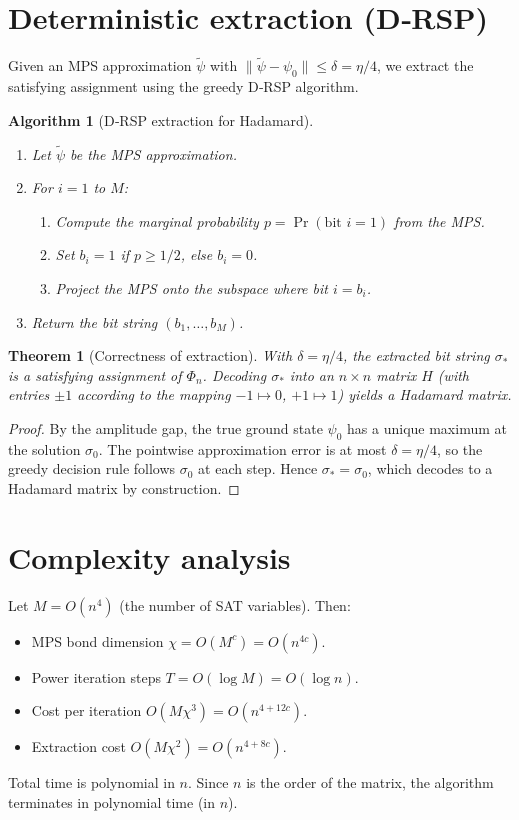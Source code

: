 \documentclass[11pt,a4paper]{article}
\newtheorem{theorem}{Theorem}[section]
\newtheorem{algorithm}{Algorithm}[section]
\begin{document}
\section{Deterministic extraction (D‑RSP)}

Given an MPS approximation $\tilde{\psi}$ with $\|\tilde{\psi} - \psi_0\| \le \delta = \eta/4$, we extract the satisfying assignment using the greedy D‑RSP algorithm.

\begin{algorithm}[D‑RSP extraction for Hadamard]\label{alg:drsp}
\begin{enumerate}
\item Let $\tilde{\psi}$ be the MPS approximation.
\item For $i = 1$ to $M$:
   \begin{enumerate}
   \item Compute the marginal probability $p = \Pr(\text{bit } i = 1)$ from the MPS.
   \item Set $b_i = 1$ if $p \ge 1/2$, else $b_i = 0$.
   \item Project the MPS onto the subspace where bit $i = b_i$.
   \end{enumerate}
\item Return the bit string $(b_1,\dots,b_M)$.
\end{enumerate}
\end{algorithm}

\begin{theorem}[Correctness of extraction]\label{thm:drsp}
With $\delta = \eta/4$, the extracted bit string $\sigma_*$ is a satisfying assignment of $\Phi_n$. Decoding $\sigma_*$ into an $n\times n$ matrix $H$ (with entries $\pm1$ according to the mapping $-1\mapsto0$, $+1\mapsto1$) yields a Hadamard matrix.
\end{theorem}
\begin{proof}
By the amplitude gap, the true ground state $\psi_0$ has a unique maximum at the solution $\sigma_0$. The pointwise approximation error is at most $\delta = \eta/4$, so the greedy decision rule follows $\sigma_0$ at each step. Hence $\sigma_* = \sigma_0$, which decodes to a Hadamard matrix by construction.
\end{proof}

\section{Complexity analysis}

Let $M = O(n^4)$ (the number of SAT variables). Then:
\begin{itemize}
\item MPS bond dimension $\chi = O(M^c) = O(n^{4c})$.
\item Power iteration steps $T = O(\log M) = O(\log n)$.
\item Cost per iteration $O(M\chi^3) = O(n^{4+12c})$.
\item Extraction cost $O(M\chi^2) = O(n^{4+8c})$.
\end{itemize}
Total time is polynomial in $n$. Since $n$ is the order of the matrix, the algorithm terminates in polynomial time (in $n$).
\end{document}
